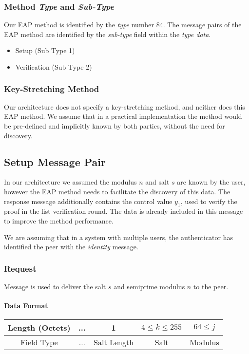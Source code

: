 \subsubsection{Method \textit{Type} and \textit{Sub-Type}}
Our EAP method is identified by the \textit{type} number $84$.
The message pairs of the EAP method are identified by the \textit{sub-type} field within the \textit{type data}.
\begin{itemize}
	\item Setup (Sub Type 1)
	\item Verification (Sub Type 2)
\end{itemize}

\subsubsection{Key-Stretching Method}
Our architecture does not specify a key-stretching method, and neither does this EAP method.
We assume that in a practical implementation the method would be pre-defined and implicitly known by both parties, without the need for discovery.

\subsection{Setup Message Pair}
In our architecture we assumed the modulus $n$ and salt $s$ are known by the user, however the EAP method needs to facilitate the discovery of this data.
The response message additionally contains the control value $y_1$, used to verify the proof in the fist verification round. The data is already included in this message to improve the method performance.

We are assuming that in a system with multiple users, the authenticator has identified the peer with the \textit{identity} message.

\subsubsection{Request} Message is used to deliver the salt $s$ and semiprime modulus $n$ to the peer.

\paragraph{Data Format}

\begin{center}
\begin{tabular}{|c|c|c|c|c|}
	\hline
	Length (Octets) & ... & 1 & $4 \le k \le 255 $ & $64 \le j$\\
	\hline
	Field Type & ... & Salt Length & Salt & Modulus\\
	\hline
\end{tabular}
\end{center}

